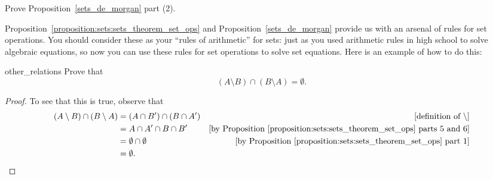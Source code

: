 \begin{exercise}{}
Prove Proposition~\ref{sets_de_morgan} part (2).
\end{exercise}
 
\medskip{}
\noindent
Proposition~\ref{proposition:sets:sets_theorem_set_ops} and Proposition~\ref{sets_de_morgan} provide us with an arsenal of rules for set operations. You should consider these as your ``rules of arithmetic'' for sets: just as you used arithmetic rules in high school to solve algebraic equations, so now you can use these rules for set operations to solve set equations.  Here is an example of how to do this:

\begin{example}{other_relations}
Prove that
\[
( A \setminus B) \cap (B \setminus A) = \emptyset.
\]

\begin{proof}
To see that this is true, observe that
\begin{align*}
( A \setminus B) \cap (B \setminus A)
& =
( A \cap B') \cap (B \cap A')   & \mbox{[definition of } \setminus] \\
& =
A \cap A' \cap B \cap B'    &\mbox{[by Proposition~\ref{proposition:sets:sets_theorem_set_ops} parts 5 and 6]} \\
&= \emptyset \cap \emptyset    &\mbox{[by Proposition~\ref{proposition:sets:sets_theorem_set_ops} part 1]} \\
& = \emptyset. \\
\end{align*}
\end{proof}
\end{example}







 
